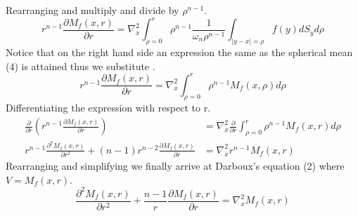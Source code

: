 Rearranging and multiply and divide by $\rho^{n-1}$.
\[
    r^{n-1} \frac{\partial M_f (x,r)}{\partial r} =  \nabla_{x}^{2}\int_{\rho = 0}^{r} \rho^{n-1}\frac{1}{\omega_n \rho^{n-1}} \int_{|y-x|= \rho}f(y)dS_y d\rho    
\]
Notice that on the right hand side an expression the same as the spherical mean (4) is attained thus we substitute .
\[
    r^{n-1} \frac{\partial M_f (x,r)}{\partial r} = \nabla_{x}^{2}\int_{\rho = 0}^{r} \rho^{n-1} M_{f}(x,\rho) d\rho    
\]
Differentiating the expression with respect to r.
\begin{align*}
\frac{\partial}{\partial r}\left( r^{n-1} \frac{\partial M_f (x,r)}{\partial r}\right) &= \nabla_{x}^{2} \frac{\partial}{\partial r}\int_{\rho = 0}^{r} \rho^{n-1} M_{f}(x,r) d\rho
\\
r^{n-1} \frac{\partial^2 M_f (x,r)}{\partial r^2} + (n-1)r^{n-2}\frac{\partial M_f (x,r)}{\partial r} &= \nabla_{x}^{2} r^{n-1} M_f (x,r)
\end{align*}
Rearranging and simplifying we finally arrive at Darboux's equation (2) where $ V=M_f (x,r) $.
\[
    \frac{\partial^2 M_f (x,r)}{\partial r^2} + \frac{n-1}{r} \frac{\partial M_f (x,r)}{\partial r} = \nabla_{x}^{2} M_f (x,r)    
\]
\newpage
\setcounter{equation}{0}
